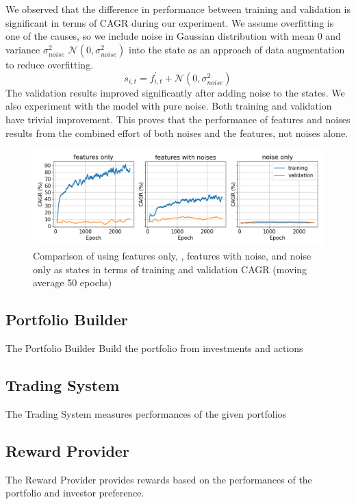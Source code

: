 We observed that the difference in performance between training and validation is significant in terms of CAGR during our experiment. We assume overfitting is one of the causes, so we include noise in Gaussian distribution with mean 0 and variance \(\sigma_{noise}^2\) \(\mathcal{N}(0,\sigma_{noise}^2)\) into the state as an approach of data augmentation to reduce overfitting.
\[
    s_{i,t} = f^{'}_{i,t} + \mathcal{N}(0,\sigma_{noise}^2)
\]
The validation results improved significantly after adding noise to the states. We also experiment with the model with pure noise. Both training and validation have trivial improvement. This proves that the performance of features and noises results from the combined effort of both noises and the features, not noises alone.
\begin{figure}[ht]
  \includegraphics[width=15cm]{images/compare_noise.png}
  \caption{Comparison of using features only, , features with noise, and noise only as states in terms of training and validation CAGR (moving average 50 epochs)}
  \label{fig:noise_diagram}
\end{figure}

\subsection {Portfolio Builder}
The Portfolio Builder Build the portfolio from investments and actions
\subsection {Trading System}
The Trading System measures performances of the given portfolios
\subsection {Reward Provider}
The Reward Provider provides rewards based on the performances of the portfolio and investor preference.